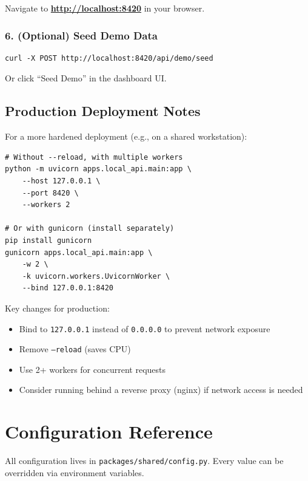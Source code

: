 \documentclass[12pt, a4paper]{article}
\newcommand{\codeinline}[1]{\texttt{\small\colorbox{codebg}{#1}}}
\newcommand{\filepath}[1]{\texttt{\small #1}}
\begin{document}
Navigate to \textbf{\url{http://localhost:8420}} in your browser.

\subsubsection{6. (Optional) Seed Demo Data}

\begin{lstlisting}[style=bash]
curl -X POST http://localhost:8420/api/demo/seed
\end{lstlisting}

Or click ``Seed Demo'' in the dashboard UI.

\subsection{Production Deployment Notes}

For a more hardened deployment (e.g., on a shared workstation):

\begin{lstlisting}[style=bash]
# Without --reload, with multiple workers
python -m uvicorn apps.local_api.main:app \
    --host 127.0.0.1 \
    --port 8420 \
    --workers 2

# Or with gunicorn (install separately)
pip install gunicorn
gunicorn apps.local_api.main:app \
    -w 2 \
    -k uvicorn.workers.UvicornWorker \
    --bind 127.0.0.1:8420
\end{lstlisting}

Key changes for production:
\begin{itemize}
    \item Bind to \codeinline{127.0.0.1} instead of \codeinline{0.0.0.0} to prevent network exposure
    \item Remove \codeinline{--reload} (saves CPU)
    \item Use 2+ workers for concurrent requests
    \item Consider running behind a reverse proxy (nginx) if network access is needed
\end{itemize}

\section{Configuration Reference}

All configuration lives in \filepath{packages/shared/config.py}. Every value can be overridden via environment variables.
\end{document}
